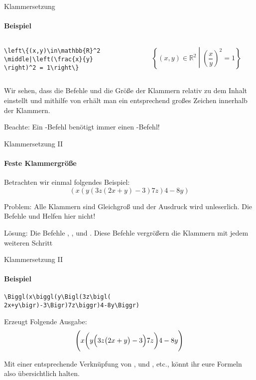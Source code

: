 \begin{frame}[fragile]{Klammersetzung}
\framesubtitle{Beispiel}
\begin{columns}
\begin{column}{0.55\textwidth}
\begin{codeblock}
\begin{verbatim}
\left\{(x,y)\in\mathbb{R}^2
\middle|\left(\frac{x}{y}
\right)^2 = 1\right\}
\end{verbatim}
\end{codeblock}
\end{column}
\begin{column}{0.35\textwidth}
\[
    \left\{(x,y)\in\mathbb{R}^2\middle|\left(\frac{x}{y}\right)^2 = 1\right\}
\]
\end{column}
\end{columns}\pause
Wir sehen, dass die Befehle  und  die Größe der Klammern relativ zu dem Inhalt einstellt und mithilfe von  erhält man ein entsprechend großes Zeichen innerhalb der Klammern. 

\medskip\pause
Beachte: \alert{Ein -Befehl benötigt immer einen -Befehl!}
\end{frame}

\begin{frame}[fragile]{Klammersetzung II}
\framesubtitle{Feste Klammergröße}
Betrachten wir einmal folgendes Beispiel:
\[
    (x(y(3z(2x+y)-3)7z)4-8y)
\]

\medskip\pause
Problem: Alle Klammern sind Gleichgroß und der Ausdruck wird unleserlich. Die Befehle  und  Helfen hier nicht!

\medskip\pause
Lösung: Die Befehle , ,  und . Diese Befehle vergrößern die Klammern mit jedem weiteren Schritt
\end{frame}

\begin{frame}[fragile]{Klammersetzung II}
\framesubtitle{Beispiel}
\begin{codeblock}
\begin{verbatim}
\Biggl(x\biggl(y\Bigl(3z\bigl(
2x+y\bigr)-3\Bigr)7z\biggr)4-8y\Biggr)
\end{verbatim}
\end{codeblock}
Erzeugt Folgende Ausgabe: 
\[
    \Biggl(x\biggl(y\Bigl(3z\bigl(2x+y\bigr)-3\Bigr)7z\biggr)4-8y\Biggr)
\]\pause

Mit einer entsprechende Verknüpfung von , und , etc., könnt ihr eure Formeln also übersichtlich halten. 
\end{frame}

